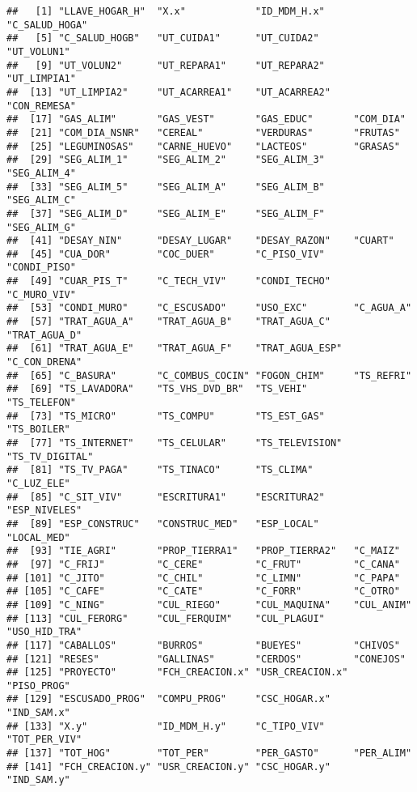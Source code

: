 \documentclass[11pt,]{article}
\begin{document}
\begin{verbatim}
##   [1] "LLAVE_HOGAR_H"  "X.x"            "ID_MDM_H.x"     "C_SALUD_HOGA"  
##   [5] "C_SALUD_HOGB"   "UT_CUIDA1"      "UT_CUIDA2"      "UT_VOLUN1"     
##   [9] "UT_VOLUN2"      "UT_REPARA1"     "UT_REPARA2"     "UT_LIMPIA1"    
##  [13] "UT_LIMPIA2"     "UT_ACARREA1"    "UT_ACARREA2"    "CON_REMESA"    
##  [17] "GAS_ALIM"       "GAS_VEST"       "GAS_EDUC"       "COM_DIA"       
##  [21] "COM_DIA_NSNR"   "CEREAL"         "VERDURAS"       "FRUTAS"        
##  [25] "LEGUMINOSAS"    "CARNE_HUEVO"    "LACTEOS"        "GRASAS"        
##  [29] "SEG_ALIM_1"     "SEG_ALIM_2"     "SEG_ALIM_3"     "SEG_ALIM_4"    
##  [33] "SEG_ALIM_5"     "SEG_ALIM_A"     "SEG_ALIM_B"     "SEG_ALIM_C"    
##  [37] "SEG_ALIM_D"     "SEG_ALIM_E"     "SEG_ALIM_F"     "SEG_ALIM_G"    
##  [41] "DESAY_NIN"      "DESAY_LUGAR"    "DESAY_RAZON"    "CUART"         
##  [45] "CUA_DOR"        "COC_DUER"       "C_PISO_VIV"     "CONDI_PISO"    
##  [49] "CUAR_PIS_T"     "C_TECH_VIV"     "CONDI_TECHO"    "C_MURO_VIV"    
##  [53] "CONDI_MURO"     "C_ESCUSADO"     "USO_EXC"        "C_AGUA_A"      
##  [57] "TRAT_AGUA_A"    "TRAT_AGUA_B"    "TRAT_AGUA_C"    "TRAT_AGUA_D"   
##  [61] "TRAT_AGUA_E"    "TRAT_AGUA_F"    "TRAT_AGUA_ESP"  "C_CON_DRENA"   
##  [65] "C_BASURA"       "C_COMBUS_COCIN" "FOGON_CHIM"     "TS_REFRI"      
##  [69] "TS_LAVADORA"    "TS_VHS_DVD_BR"  "TS_VEHI"        "TS_TELEFON"    
##  [73] "TS_MICRO"       "TS_COMPU"       "TS_EST_GAS"     "TS_BOILER"     
##  [77] "TS_INTERNET"    "TS_CELULAR"     "TS_TELEVISION"  "TS_TV_DIGITAL" 
##  [81] "TS_TV_PAGA"     "TS_TINACO"      "TS_CLIMA"       "C_LUZ_ELE"     
##  [85] "C_SIT_VIV"      "ESCRITURA1"     "ESCRITURA2"     "ESP_NIVELES"   
##  [89] "ESP_CONSTRUC"   "CONSTRUC_MED"   "ESP_LOCAL"      "LOCAL_MED"     
##  [93] "TIE_AGRI"       "PROP_TIERRA1"   "PROP_TIERRA2"   "C_MAIZ"        
##  [97] "C_FRIJ"         "C_CERE"         "C_FRUT"         "C_CANA"        
## [101] "C_JITO"         "C_CHIL"         "C_LIMN"         "C_PAPA"        
## [105] "C_CAFE"         "C_CATE"         "C_FORR"         "C_OTRO"        
## [109] "C_NING"         "CUL_RIEGO"      "CUL_MAQUINA"    "CUL_ANIM"      
## [113] "CUL_FERORG"     "CUL_FERQUIM"    "CUL_PLAGUI"     "USO_HID_TRA"   
## [117] "CABALLOS"       "BURROS"         "BUEYES"         "CHIVOS"        
## [121] "RESES"          "GALLINAS"       "CERDOS"         "CONEJOS"       
## [125] "PROYECTO"       "FCH_CREACION.x" "USR_CREACION.x" "PISO_PROG"     
## [129] "ESCUSADO_PROG"  "COMPU_PROG"     "CSC_HOGAR.x"    "IND_SAM.x"     
## [133] "X.y"            "ID_MDM_H.y"     "C_TIPO_VIV"     "TOT_PER_VIV"   
## [137] "TOT_HOG"        "TOT_PER"        "PER_GASTO"      "PER_ALIM"      
## [141] "FCH_CREACION.y" "USR_CREACION.y" "CSC_HOGAR.y"    "IND_SAM.y"
\end{verbatim}
\end{document}

